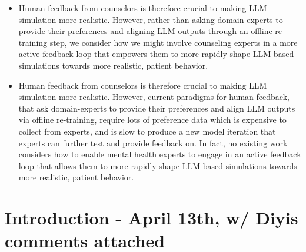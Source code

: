 \begin{itemize}
    \item Human feedback from counselors is therefore crucial to making LLM simulation more realistic. However,  rather than asking domain-experts to provide their preferences and aligning LLM outputs through an offline re-training step, we consider how we might involve counseling experts in a more active feedback loop that empowers them to more rapidly shape LLM-based simulations towards more realistic, patient behavior.  
    \item Human feedback from counselors is therefore crucial to making LLM simulation more realistic. However,  current paradigms for human feedback, that ask domain-experts to provide their preferences and align LLM outputs via offline re-training, require lots of preference data which is expensive to collect from experts, and is slow to produce a new model iteration that experts can further test and provide feedback on. In fact, no existing work considers how to enable mental health experts to engage in an active feedback loop that allows them to more rapidly shape LLM-based simulations towards more realistic, patient behavior.  
\end{itemize}

\section{Introduction - April 13th, w/ Diyis comments attached}

